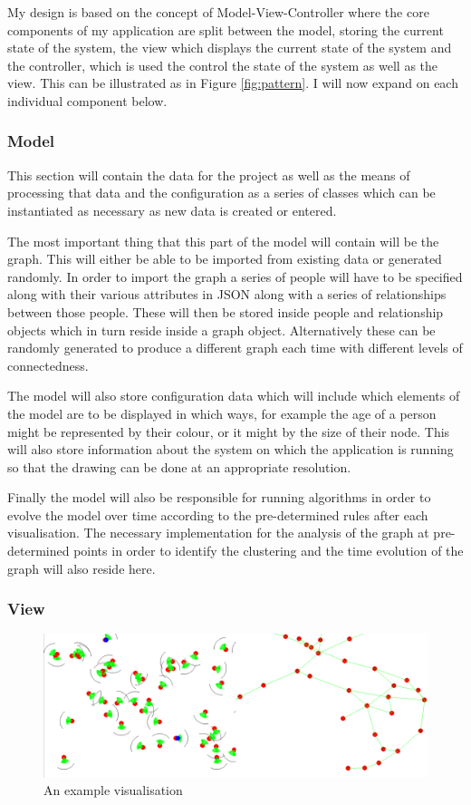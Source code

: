 \documentclass[12pt,a4paper]{article}
\begin{document}
My design is based on the concept of Model-View-Controller where the core components of my application are split between the model, storing the current state of the system, the view which displays the current state of the system and the controller, which is used the control the state of the system as well as the view. This can be illustrated as in Figure \ref{fig:pattern}. I will now expand on each individual component below.

\subsubsection{Model}
This section will contain the data for the project as well as the means of processing that data and the configuration as a series of classes which can be instantiated as necessary as new data is created or entered.

The most important thing that this part of the model will contain will be the graph. This will either be able to be imported from existing data or generated randomly. In order to import the graph a series of people will have to be specified along with their various attributes in JSON along with a series of relationships between those people. These will then be stored inside people and relationship objects which in turn reside inside a graph object. Alternatively these can be randomly generated to produce a different graph each time with different levels of connectedness.

The model will also store configuration data which will include which elements of the model are to be displayed in which ways, for example the age of a person might be represented by their colour, or it might by the size of their node. This will also store information about the system on which the application is running so that the drawing can be done at an appropriate resolution.

Finally the model will also be responsible for running algorithms in order to evolve the model over time according to the pre-determined rules after each visualisation. The necessary implementation for the analysis of the graph at pre-determined points in order to identify the clustering and the time evolution of the graph will also reside here.

\subsubsection{View}
\begin{figure}[htb]
\begin{center}
\caption{An example visualisation}
\label{fig:visualexample}
\includegraphics[width=6in]{screen.png}
\end{center}
\end{figure}
\end{document}
